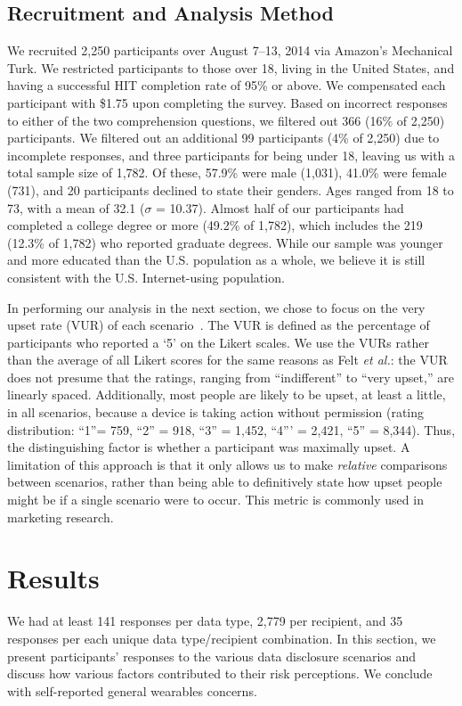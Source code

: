 \documentclass[conference]{IEEEtran}
\begin{document}
\subsection{Recruitment and Analysis Method}
We recruited 2,250 participants over August 7--13, 2014 via Amazon's Mechanical Turk. We restricted participants to those over 18, living in the United States, and having a successful HIT completion rate of 95\% or above. We compensated each participant with \$1.75 upon completing the survey. Based on incorrect responses to either of the two comprehension questions, we filtered out 366 (16\% of 2,250) participants. We filtered out an additional 99 participants (4\% of 2,250) due to incomplete responses, and three participants for being under 18, leaving us with a total sample size of 1,782. Of these, 57.9\% were male (1,031), 41.0\% were female (731), and 20 participants declined to state their genders. Ages ranged from 18 to 73, with a mean of 32.1 ($\sigma$ = 10.37). Almost half of our participants had completed a college degree or more (49.2\% of 1,782), which includes the 219 (12.3\% of 1,782) who reported graduate degrees. While our sample was younger and more educated than the U.S. population as a whole, we believe it is still consistent with the U.S. Internet-using population.

In performing our analysis in the next section, we chose to focus on the very upset rate (VUR) of each scenario~\cite{Felt}.  The VUR is defined as the percentage of participants who reported a `5' on the Likert scales. 
We use the VURs rather than the average of all Likert scores for the same reasons as Felt {\it et al.}: the VUR does not presume that the ratings, ranging from ``indifferent'' to ``very upset,'' are linearly spaced. Additionally, most people are likely to be upset, at least a little, in all scenarios, because a device is taking action without permission (rating distribution: ``1''= 759, ``2'' = 918, ``3'' = 1,452, ``4''' = 2,421, ``5'' = 8,344). Thus, the distinguishing factor is whether a participant was maximally upset. A limitation of this approach is that it only allows us to make {\it relative} comparisons between scenarios, rather than being able to definitively state how upset people might be if a single scenario were to occur. This metric is commonly used in marketing research. 

\section{Results}
We had at least 141 responses per data type, 2,779 per recipient, and 35 responses per each unique data type/recipient combination. In this section, we present participants' responses to the various data disclosure scenarios and discuss how various factors contributed to their risk perceptions. We conclude with self-reported general wearables concerns.
\end{document}
